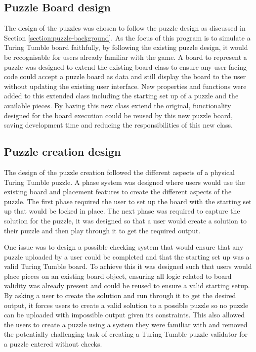 \documentclass{l4proj}
\begin{document}
\subsection{Puzzle Board design}
The design of the puzzles was chosen to follow the puzzle design as discussed in Section \ref{section:puzzle-background}. As the focus of this program is to simulate a Turing Tumble board faithfully, by following the existing puzzle design, it would be recognisable for users already familiar with the game. A board to represent a puzzle was designed to extend the existing board class to ensure any user facing code could accept a puzzle board as data and still display the board to the user without updating the existing user interface. New properties and functions were added to this extended class including the starting set up of a puzzle and the available pieces. By having this new class extend the original, functionality designed for the board execution could be reused by this new puzzle board, saving development time and reducing the responsibilities of this new class. 

\subsection{Puzzle creation design}
The design of the puzzle creation followed the different aspects of a physical Turing Tumble puzzle. A phase system was designed where users would use the existing board and placement features to create the different aspects of the puzzle. The first phase required the user to set up the board with the starting set up that would be locked in place. The next phase was required to capture the solution for the puzzle, it was designed so that a user would create a solution to their puzzle and then play through it to get the required output. 

One issue was to design a possible checking system that would ensure that any puzzle uploaded by a user could be completed and that the starting set up was a valid Turing Tumble board. To achieve this it was designed such that users would place pieces on an existing board object, ensuring all logic related to board validity was already present and could be reused to ensure a valid starting setup. By asking a user to create the solution and run through it to get the desired output, it forces users to create a valid solution to a possible puzzle so no puzzle can be uploaded with impossible output given its constraints. This also allowed the users to create a puzzle using a system they were familiar with and removed the potentially challenging task of creating a Turing Tumble puzzle validator for a puzzle entered without checks. 
\end{document}
